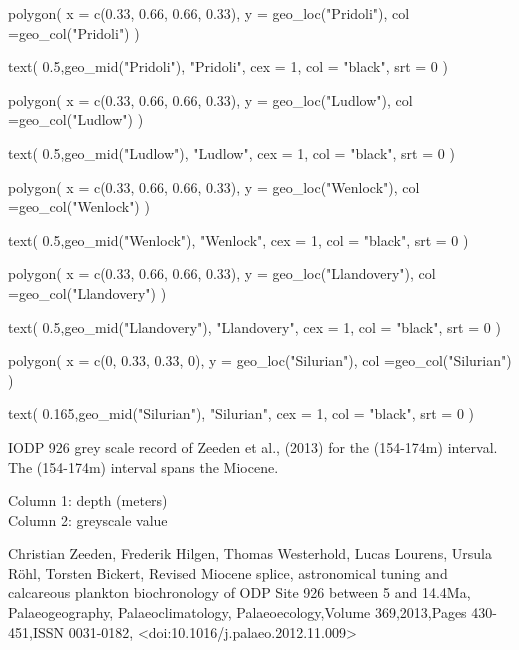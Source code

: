 \documentclass[a4paper]{book}
\begin{document}
\begin{Examples}
\begin{ExampleCode}
polygon(
 x = c(0.33, 0.66, 0.66, 0.33),
 y = geo_loc("Pridoli"),
 col =geo_col("Pridoli")
)

text(
 0.5,geo_mid("Pridoli"),
 "Pridoli",
 cex = 1,
 col = "black",
 srt = 0
)


polygon(
 x = c(0.33, 0.66, 0.66, 0.33),
 y = geo_loc("Ludlow"),
 col =geo_col("Ludlow")
)

text(
 0.5,geo_mid("Ludlow"),
 "Ludlow",
 cex = 1,
 col = "black",
 srt = 0
)

polygon(
 x = c(0.33, 0.66, 0.66, 0.33),
 y = geo_loc("Wenlock"),
 col =geo_col("Wenlock")
)

text(
 0.5,geo_mid("Wenlock"),
 "Wenlock",
 cex = 1,
 col = "black",
 srt = 0
)

polygon(
 x = c(0.33, 0.66, 0.66, 0.33),
 y = geo_loc("Llandovery"),
 col =geo_col("Llandovery")
)

text(
 0.5,geo_mid("Llandovery"),
 "Llandovery",
 cex = 1,
 col = "black",
 srt = 0
)

polygon(
 x = c(0, 0.33, 0.33, 0),
 y = geo_loc("Silurian"),
 col =geo_col("Silurian")
)

text(
 0.165,geo_mid("Silurian"),
 "Silurian",
 cex = 1,
 col = "black",
 srt = 0
)


\end{ExampleCode}
\end{Examples}
%
\begin{Description}
IODP 926 grey scale record of Zeeden et al., (2013) for the (154-174m) interval.
The (154-174m) interval spans the Miocene.
\end{Description}
%
\begin{Details}
Column 1: depth (meters)\\{}
Column 2: greyscale value\\{}
\end{Details}
%
\begin{References}
Christian Zeeden, Frederik Hilgen, Thomas Westerhold, Lucas Lourens, Ursula Röhl, Torsten Bickert,
Revised Miocene splice, astronomical tuning and calcareous plankton biochronology of ODP Site 926 between 5 and 14.4Ma,
Palaeogeography, Palaeoclimatology, Palaeoecology,Volume 369,2013,Pages 430-451,ISSN 0031-0182,
<doi:10.1016/j.palaeo.2012.11.009>
\end{References}
\end{document}
